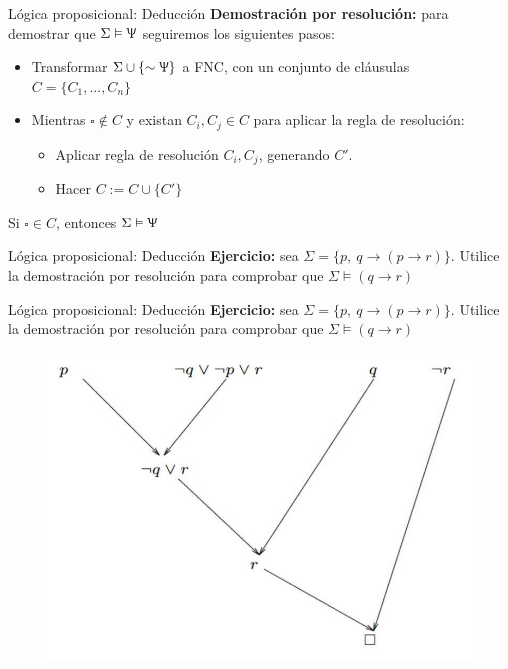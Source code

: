 \documentclass{beamer}
\begin{document}
\begin{frame}{Lógica proposicional: Deducción}
  \textbf{Demostración por resolución:} para demostrar que
  $\Sigma \vDash \Uppsi$ seguiremos los siguientes pasos:

  \begin{itemize}
    \item Transformar $\Sigma \cup \{\sim \Uppsi\}$ a FNC, con un conjunto de
          cláusulas $C = \{C_{1}, ..., C_{n}\}$
    \item Mientras $\square \notin C$ y existan $C_{i}, C_{j} \in C$ para
          aplicar la regla de resolución:
          \begin{itemize}
            \item Aplicar regla de resolución $C_{i}, C_{j}$, generando $C'$.
            \item Hacer $C := C \cup \{C'\}$
          \end{itemize}
  \end{itemize}

  Si $\square \in C$, entonces $\Sigma \vDash \Uppsi$
\end{frame}


\begin{frame}{Lógica proposicional: Deducción}
  \textbf{Ejercicio:} sea $\Sigma = \{p,\ q \rightarrow (p \rightarrow r)\}$.
  Utilice la demostración por resolución para comprobar que
  $\Sigma \vDash (q \rightarrow r)$
\end{frame}


\begin{frame}{Lógica proposicional: Deducción}
  \textbf{Ejercicio:} sea $\Sigma = \{p,\ q \rightarrow (p \rightarrow r)\}$.
  Utilice la demostración por resolución para comprobar que
  $\Sigma \vDash (q \rightarrow r)$

  \begin{figure}
    \centering
    \includegraphics[width=.8\textwidth]{images/demostracion_por_resolucion.png}
  \end{figure}
\end{frame}
\end{document}

